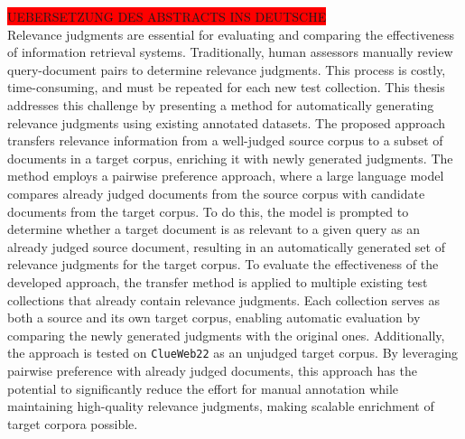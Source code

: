 \colorbox{red}{UEBERSETZUNG DES ABSTRACTS INS DEUTSCHE}\\
Relevance judgments are essential for evaluating and comparing the effectiveness of information retrieval systems. Traditionally, human assessors manually review query-document pairs to determine relevance judgments. This process is costly, time-consuming, and must be repeated for each new test collection. This thesis addresses this challenge by presenting a method for automatically generating relevance judgments using existing annotated datasets. The proposed approach transfers relevance information from a well-judged source corpus to a subset of documents in a target corpus, enriching it with newly generated judgments. The method employs a pairwise preference approach, where a large language model compares already judged documents from the source corpus with candidate documents from the target corpus. To do this, the model is prompted to determine whether a target document is as relevant to a given query as an already judged source document, resulting in an automatically generated set of relevance judgments for the target corpus. To evaluate the effectiveness of the developed approach, the transfer method is applied to multiple existing test collections that already contain relevance judgments. Each collection serves as both a source and its own target corpus, enabling automatic evaluation by comparing the newly generated judgments with the original ones. Additionally, the approach is tested on \texttt{ClueWeb22} as an unjudged target corpus. By leveraging pairwise preference with already judged documents, this approach has the potential to significantly reduce the effort for manual annotation while maintaining high-quality relevance judgments, making scalable enrichment of target corpora possible.